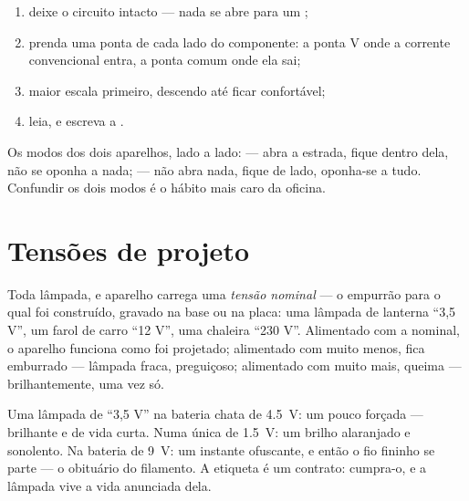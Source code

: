 \begin{method}\label{met:g8:voltage-voltmeter:measure}
\begin{enumerate}
  \item deixe o circuito intacto --- nada se abre para um
        ;
  \item prenda uma ponta de cada lado do componente: a ponta \unit{V}
        onde a corrente convencional entra, a ponta comum onde ela
        sai;
  \item maior escala primeiro, descendo até ficar confortável;
  \item leia, e escreva a .
\end{enumerate}
Os modos dos dois aparelhos, lado a lado:  --- abra a
estrada, fique dentro dela, não se oponha a nada;  --- não
abra nada, fique de lado, oponha-se a tudo. Confundir os dois modos é
o hábito mais caro da oficina.
\end{method}

\section{Tensões de projeto}

\begin{definition}\label{def:g8:voltage-voltmeter:nominal}
Toda lâmpada,  e aparelho carrega uma \emph{tensão
nominal} --- o empurrão para o qual foi
construído, gravado na base ou na placa: uma lâmpada de lanterna
``3,5 V'', um farol de carro ``12 V'', uma chaleira ``230 V''.
Alimentado com a  nominal, o aparelho funciona como foi
projetado; alimentado com muito menos, fica emburrado --- lâmpada
fraca,  preguiçoso; alimentado com muito mais, queima ---
brilhantemente, uma vez só.
\end{definition}

\begin{example}\label{ex:g8:voltage-voltmeter:matching}
Uma lâmpada de ``3,5 V'' na bateria chata de \qty{4.5}{V}: um pouco
forçada --- brilhante e de vida curta. Numa única  de
\qty{1.5}{V}: um brilho alaranjado e sonolento. Na bateria de
\qty{9}{V}: um instante ofuscante, e então o fio fininho se parte ---
o obituário do filamento. A etiqueta é um contrato: cumpra-o, e a
lâmpada vive a vida anunciada dela.
\end{example}

